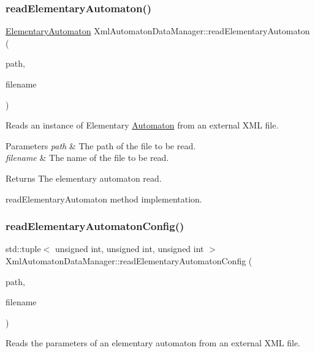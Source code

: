 \subsubsection{\texorpdfstring{read\+Elementary\+Automaton()}{readElementaryAutomaton()}}
{\footnotesize\ttfamily \mbox{\hyperlink{class_elementary_automaton}{Elementary\+Automaton}} Xml\+Automaton\+Data\+Manager\+::read\+Elementary\+Automaton (\begin{DoxyParamCaption}\item[{Q\+String}]{path,  }\item[{Q\+String}]{filename }\end{DoxyParamCaption})}

Reads an instance of Elementary \mbox{\hyperlink{class_automaton}{Automaton}} from an external X\+ML file.


\begin{DoxyParams}{Parameters}
{\em path} & The path of the file to be read. \\
\hline
{\em filename} & The name of the file to be read. \\
\hline
\end{DoxyParams}
\begin{DoxyReturn}{Returns}
The elementary automaton read.
\end{DoxyReturn}
read\+Elementary\+Automaton method implementation. \mbox{\label{class_xml_automaton_data_manager_a41937afcc79edb40a3077351aa529a3a}} 
\subsubsection{\texorpdfstring{read\+Elementary\+Automaton\+Config()}{readElementaryAutomatonConfig()}}
{\footnotesize\ttfamily std\+::tuple$<$ unsigned int, unsigned int, unsigned int $>$ Xml\+Automaton\+Data\+Manager\+::read\+Elementary\+Automaton\+Config (\begin{DoxyParamCaption}\item[{Q\+String}]{path,  }\item[{Q\+String}]{filename }\end{DoxyParamCaption})}

Reads the parameters of an elementary automaton from an external X\+ML file.


